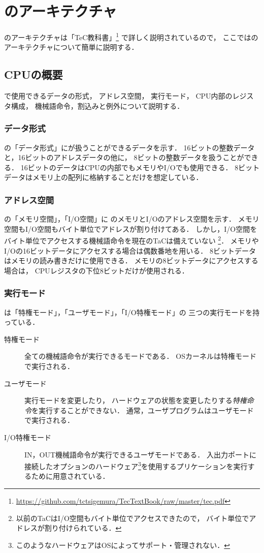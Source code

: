 \chapter{{\tac}のアーキテクチャ}

{\tec}のアーキテクチャは「TeC教科書」\footnote{
\url{https://github.com/tctsigemura/TecTextBook/raw/master/tec.pdf}}
で詳しく説明されているので，
ここでは{\tac}のアーキテクチャについて簡単に説明する．

\section{CPUの概要}
{\tac}で使用できるデータの形式，
アドレス空間，
実行モード，
CPU内部のレジスタ構成，
機械語命令，割込みと例外について説明する．

\subsection{データ形式}
の「データ形式」に{\tac}が扱うことができるデータを示す．
16ビットの整数データと，16ビットのアドレスデータの他に，
8ビットの整数データを扱うことができる．
16ビットのデータはCPUの内部でもメモリやI/Oでも使用できる．
8ビットデータはメモリ上の配列に格納することだけを想定している．

\subsection{アドレス空間}
の「メモリ空間」，「I/O空間」に
{\tac}のメモリとI/Oのアドレス空間を示す．
メモリ空間もI/O空間もバイト単位でアドレスが割り付けてある．
しかし，I/O空間をバイト単位でアクセスする機械語命令を現在のTaCは備えていない
\footnote{以前のTaCはI/O空間もバイト単位でアクセスできたので，
バイト単位でアドレスが割り付けられている．}．
メモリやI/Oの16ビットデータにアクセスする場合は偶数番地を用いる．
8ビットデータはメモリの読み書きだけに使用できる．
メモリの8ビットデータにアクセスする場合は，
CPUレジスタの下位8ビットだけが使用される．

\subsection{実行モード}
{\tac}は「特権モード」，「ユーザモード」，「I/O特権モード」の
三つの実行モードを持っている．

\begin{description}
\item[特権モード]
全ての機械語命令が実行できるモードである．
OSカーネルは特権モードで実行される．
\item[ユーザモード]
実行モードを変更したり，
ハードウェアの状態を変更したりする\emph{特権命令}を実行することができない．
通常，ユーザプログラムはユーザモードで実行される．
\item[I/O特権モード]
IN，OUT機械語命令が実行できるユーザモードである．
入出力ポートに接続したオプションのハードウェア\footnote{
このようなハードウェアはOSによってサポート・管理されない．
}を使用するプリケーションを実行するために用意されている．
\end{description}

